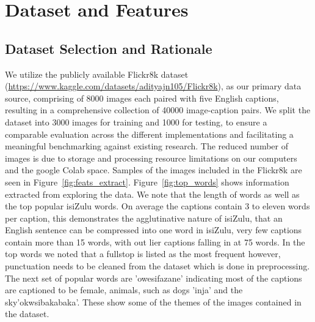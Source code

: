 \documentclass{article}
\begin{document}
\section{Dataset and Features}

\subsection{Dataset Selection and Rationale}
We utilize the  publicly available Flickr8k dataset (\url{https://www.kaggle.com/datasets/adityajn105/Flickr8k}), as our primary data source, comprising of 8000 images each paired with five English captions, resulting in a comprehensive collection of 40000 image-caption pairs. We split the dataset into 3000 images for training and 1000 for testing, to ensure a comparable evaluation across the different implementations and facilitating a meaningful benchmarking against existing research. The reduced number of images is due to storage and processing resource limitations on our computers and the google Colab space. Samples of the images included in the Flickr8k are seen in Figure~\ref{fig:feats_extract}. Figure~\ref{fig:top_words} shows information extracted from exploring the data. We note that the length of words as well as the top popular isiZulu words. On average the captions contain 3 to eleven words per caption, this demonstrates the agglutinative nature of isiZulu, that an English sentence can be compressed into one word in isiZulu, very few captions contain more than 15 words, with out lier captions falling in at 75 words. In the top words we noted that a fullstop is listed as the most frequent however, punctuation needs to be cleaned from the dataset which is done in preprocessing. The next set of popular words are 'owesifazane' indicating most of the captions are captioned to be female, animals, such as dogs 'inja' and the sky'okwsibakabaka'. These show some of the themes of the images contained in the dataset.
\end{document}
